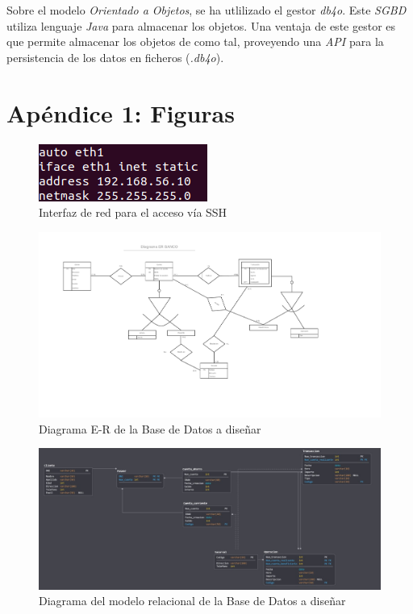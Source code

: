 \documentclass{article}
\begin{document}
Sobre el modelo \emph{Orientado a Objetos}, se ha utlilizado el gestor \emph{db4o}. Este \emph{SGBD} utiliza lenguaje \emph{Java} para almacenar los objetos. Una ventaja de este gestor es que permite almacenar los objetos de como tal, proveyendo una \emph{API} para la persistencia de los datos en ficheros (\emph{.db4o}).


\newpage
\section{Apéndice 1: Figuras}

\begin{figure}[h!]
	\centering
		\includegraphics[scale=1.5]{images/interfacesred.png}
			\caption{Interfaz de red para el acceso vía SSH}
		\label{FIG:interfacesRED}
\end{figure}

\begin{figure}[h!]
	\centering
		\includegraphics[scale=0.5]{images/diagramaer.png}
			\caption{Diagrama E-R de la Base de Datos a diseñar}
			\label{FIG:diagramaER}
\end{figure}

\begin{figure}[h!]
	\centering
		\includegraphics[scale=0.6]{images/diagramaRelacional.jpg}
			\caption{Diagrama del modelo relacional de la Base de Datos a diseñar}
			\label{FIG:diagramaRel}
\end{figure}
\end{document}
